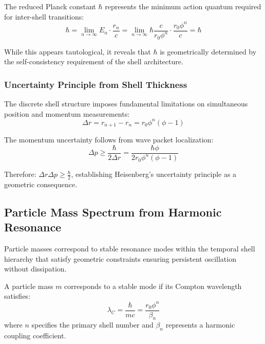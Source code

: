 \documentclass[12pt,a4paper]{article}
\begin{document}
The reduced Planck constant $\hbar$ represents the minimum action quantum required for inter-shell transitions:
\begin{equation}
\hbar = \lim_{n \to \infty} E_n \cdot \frac{r_n}{c} = \lim_{n \to \infty} \hbar \frac{c}{r_0 \phi^n} \cdot \frac{r_0 \phi^n}{c} = \hbar
\end{equation}

While this appears tautological, it reveals that $\hbar$ is geometrically determined by the self-consistency requirement of the shell architecture.

\subsubsection{Uncertainty Principle from Shell Thickness}

The discrete shell structure imposes fundamental limitations on simultaneous position and momentum measurements:
\begin{equation}
\Delta r = r_{n+1} - r_n = r_0 \phi^n (\phi - 1)
\end{equation}

The momentum uncertainty follows from wave packet localization:
\begin{equation}
\Delta p \geq \frac{\hbar}{2\Delta r} = \frac{\hbar \phi}{2r_0 \phi^n (\phi - 1)}
\end{equation}

Therefore: $\Delta r \Delta p \geq \frac{\hbar}{2}$, establishing Heisenberg's uncertainty principle as a geometric consequence.

\subsection{Particle Mass Spectrum from Harmonic Resonance}

Particle masses correspond to stable resonance modes within the temporal shell hierarchy that satisfy geometric constraints ensuring persistent oscillation without dissipation.

\begin{definition}
A particle mass $m$ corresponds to a stable mode if its Compton wavelength satisfies:
\begin{equation}
\lambda_C = \frac{\hbar}{mc} = \frac{r_0 \phi^n}{\beta_n}
\end{equation}
where $n$ specifies the primary shell number and $\beta_n$ represents a harmonic coupling coefficient.
\end{definition}
\end{document}

